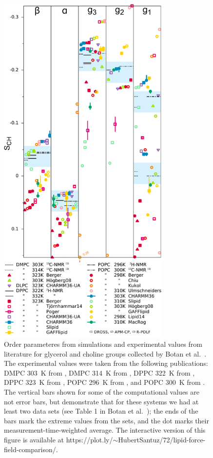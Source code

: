 \documentclass[aps,prl,superscriptaddress,twocolumn]{revtex4}
\begin{document}
\begin{figure}[]
  \includegraphics[width=8.6cm]{../Fig/comparisonSorted.pdf}
\newline
  \caption{\label{HGorderparameters}
  Order parameteres from simulations and experimental values from literature for glycerol and choline groups collected by Botan et al.~\cite{botan15}.
The experimental values were taken from the following publications:
 DMPC 303~K from \cite{gross97},
 DMPC 314~K from \cite{dvinskikh05a},
 DPPC 322~K from \cite{gally75},
 DPPC 323~K from \cite{akutsu81},
 POPC 296~K from \cite{bechinger91}, and
 POPC 300~K from \cite{ferreira13}.
  The vertical bars shown for some of the computational values are not error bars, but demonstrate that for 
these systems we had at least two data sets (see Table 1 in Botan et al.~\cite{botan15});
the ends of the bars mark the extreme values from the sets, and the dot marks their measurement-time-weighted average. 
The interactive version of this figure is available at  https://plot.ly/$\sim$HubertSantuz/72/lipid-force-field-comparison/.
} 
\end{figure}
\end{document}
